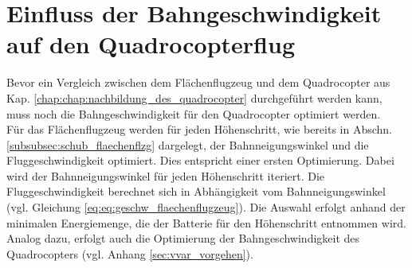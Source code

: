 \section{Einfluss der Bahngeschwindigkeit auf den Quadrocopterflug}
Bevor ein Vergleich zwischen dem Flächenflugzeug und dem Quadrocopter aus Kap. \ref{chap:chap:nachbildung_des_quadrocopter} durchgeführt werden kann, muss noch die Bahngeschwindigkeit für den Quadrocopter optimiert werden. \\
Für das Flächenflugzeug werden für jeden Höhenschritt, wie bereits in Abschn. \ref{subsubsec:schub_flaechenflzg} dargelegt, der Bahnneigungswinkel und die Fluggeschwindigkeit optimiert. Dies entspricht einer ersten Optimierung. Dabei wird der Bahnneigungswinkel für jeden Höhenschritt iteriert. Die Fluggeschwindigkeit berechnet sich in Abhängigkeit vom Bahnneigungswinkel (vgl. Gleichung \eqref{eq:eq:geschw_flaechenflugzeug}). Die Auswahl erfolgt anhand der minimalen Energiemenge, die der Batterie für den Höhenschritt entnommen wird. Analog dazu, erfolgt auch die Optimierung der Bahngeschwindigkeit des Quadrocopters (vgl. Anhang \ref{sec:vvar_vorgehen}). \\
